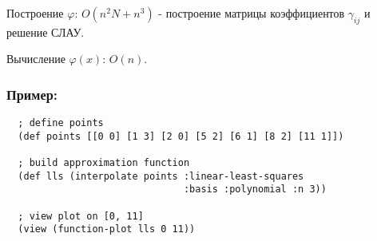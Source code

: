 Построение $\varphi$: $ O(n^2N + n^3)$ - построение матрицы коэффициентов $\gamma_{ij}$ и решение СЛАУ.

Вычисление $\varphi(x)$: $O(n)$.

\subsubsection{Пример:}

\begin{verbatim}
  ; define points
  (def points [[0 0] [1 3] [2 0] [5 2] [6 1] [8 2] [11 1]])

  ; build approximation function
  (def lls (interpolate points :linear-least-squares
                               :basis :polynomial :n 3))

  ; view plot on [0, 11]
  (view (function-plot lls 0 11))
\end{verbatim}




